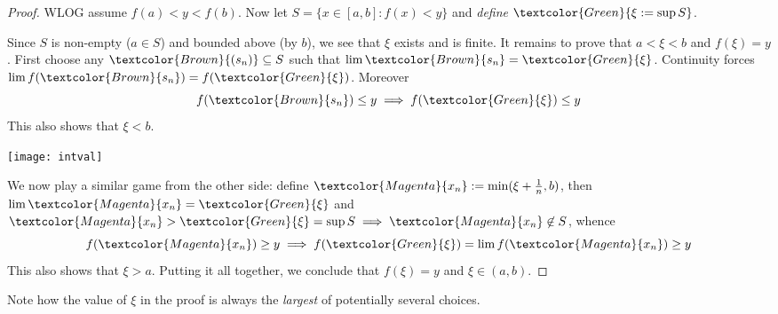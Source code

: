 \begin{proof}
	WLOG assume $f(a)<y<f(b)$. Now let $S=\{x\in[a,b]:f(x)<y\}$ and \emph{define} $\textcolor{Green}{\xi:=\sup S}$.\par
	\begin{minipage}[t]{0.51\linewidth}\vspace{0pt}
		Since $S$ is non-empty ($a\in S$) and bounded above (by $b$), we see that $\xi$ exists and is finite. It remains to prove that $a<\xi<b$ and $f(\xi)=y$.\smallbreak
		First choose any $\textcolor{Brown}{(s_n)}\subseteq S$ such that\footnotemark{} $\lim\textcolor{Brown}{s_n}=\textcolor{Green}{\xi}$.
		Continuity forces $\lim f(\textcolor{Brown}{s_n})=f(\textcolor{Green}{\xi})$. Moreover
		\[
			f(\textcolor{Brown}{s_n})\le y\implies f(\textcolor{Green}{\xi})\le y
		\]
		This also shows that $\xi<b$.
	\end{minipage}
	\hfill
	\begin{minipage}[t]{0.48\linewidth}\vspace{0pt}
		\hfill\texttt{[image: intval]}
	\end{minipage}
	\smallbreak
	We now play a similar game from the other side: define $\textcolor{Magenta}{x_n}:=\min(\xi+\frac 1n,b)$, then $\lim\textcolor{Magenta}{x_n}=\textcolor{Green}{\xi}$ and $\textcolor{Magenta}{x_n}>\textcolor{Green}{\xi}=\sup S\implies \textcolor{Magenta}{x_n}\not\in S$, whence
  \[
  	f(\textcolor{Magenta}{x_n})\ge y\implies f(\textcolor{Green}{\xi})=\lim f(\textcolor{Magenta}{x_n})\ge y
  \]
  This also shows that $\xi>a$. Putting it all together, we conclude that $f(\xi)=y$ and $\xi\in(a,b)$.
\end{proof}


Note how the value of $\xi$ in the proof is always the \emph{largest} of potentially several choices.\smallbreak




